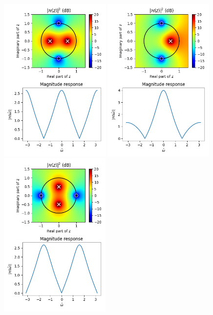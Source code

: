 \begin{figure}
\begin{center}
\includegraphics[width=0.49\textwidth]{code/026_iir/ex1.png}
\includegraphics[width=0.49\textwidth]{code/026_iir/ex2.png}
\includegraphics[width=0.49\textwidth]{code/026_iir/ex3.png}

\end{center}
\end{figure}
